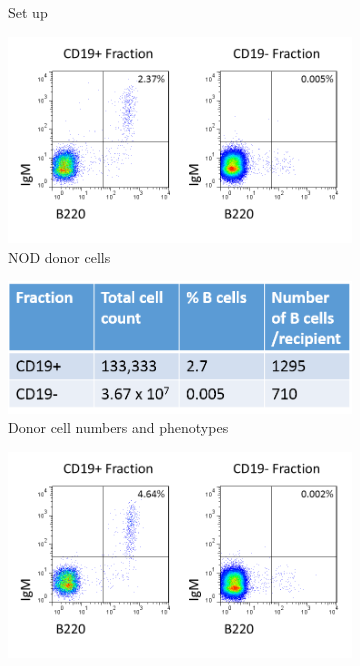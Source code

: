 \begin{figure}
\begin{subfigure}{0.5\textwidth}
	\caption{Set up}
	\label{subfig:GFPtransfersetup}
	\end{subfigure}
	\begin{subfigure}{0.5\textwidth}
	\includegraphics[width=\textwidth]{Figures/NODdonor.png}
	\caption{NOD donor cells}
	\label{subfig:NODdonorseparation}
	\end{subfigure}
	\begin{subfigure}{0.5\textwidth}
	\centering
	\includegraphics[width=\textwidth]{Figures/WTdonortable2.png}
	\caption{Donor cell numbers and phenotypes}
	\label{subfig:WTdonortable}
	\end{subfigure}
	\begin{subfigure}{0.5\textwidth}
	\includegraphics[width=\textwidth]{Figures/GFPdonor.png}

\end{subfigure}
\end{figure}
